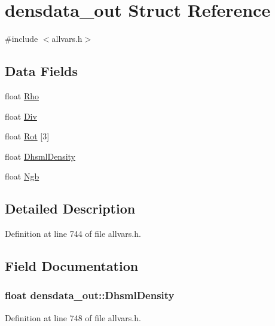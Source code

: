 \hypertarget{structdensdata__out}{
\section{densdata\_\-out Struct Reference}
\label{structdensdata__out}
}


{\ttfamily \#include $<$allvars.h$>$}

\subsection*{Data Fields}
\begin{DoxyCompactItemize}
\item 
float \hyperlink{structdensdata__out_a7a4edc5de1283464a658fb089594d11c}{Rho}
\item 
float \hyperlink{structdensdata__out_af3c2ce61474da5764ac1b50155c0aa7e}{Div}
\item 
float \hyperlink{structdensdata__out_a748be7d0e50757980389fb667d6d022b}{Rot} \mbox{[}3\mbox{]}
\item 
float \hyperlink{structdensdata__out_a4a4b92bd40642207d3e6748ae90c8d49}{DhsmlDensity}
\item 
float \hyperlink{structdensdata__out_ad78ddc3f9c8fb77b2e98f04d5cd2dfb4}{Ngb}
\end{DoxyCompactItemize}


\subsection{Detailed Description}


Definition at line 744 of file allvars.h.



\subsection{Field Documentation}
\hypertarget{structdensdata__out_a4a4b92bd40642207d3e6748ae90c8d49}{
\subsubsection[{DhsmlDensity}]{\setlength{\rightskip}{0pt plus 5cm}float {\bf densdata\_\-out::DhsmlDensity}}}
\label{structdensdata__out_a4a4b92bd40642207d3e6748ae90c8d49}


Definition at line 748 of file allvars.h.




